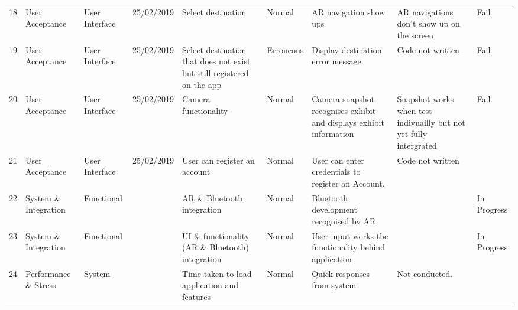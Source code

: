 \begin{adjustbox}{angle=90}
\begin{tabular}{l|l|l|l|p{3cm}|l|p{3cm}|p{3cm}|l}
18      & User Acceptance               & User Interface     & 25/02/2019     & Select destination                                                            & Normal    & AR navigation show ups                                                       & AR navigations don't show up on the screen                                  & Fail        \\
19      & User Acceptance               & User Interface     & 25/02/2019     & Select destination that does not exist but still registered on the app        & Erroneous & Display destination error message                                            & Code not written                                                            & Fail        \\
20      & User Acceptance               & User Interface     & 25/02/2019     & Camera functionality                                                          & Normal    & Camera snapshot recognises exhibit and displays exhibit information          & Snapshot works when test indivuailly but not yet fully intergrated          & Fail        \\
21      & User Acceptance               & User Interface     & 25/02/2019     & User can register an account                                                  & Normal    & User can enter credentials to register an Account.                           & Code not written                                                            &             \\
22      & System \& Integration         & Functional         &                & AR \& Bluetooth integration                                                   & Normal    & Bluetooth development recognised by AR                                       &                                                                             & In Progress \\
23      & System \& Integration         & Functional         &                & UI \& functionality (AR \& Bluetooth) integration                             & Normal    & User input works the functionality behind application                        &                                                                             & In Progress \\
24      & Performance \& Stress         & System             &                & Time taken to load application and features                                   & Normal    & Quick responses from system                                                  & Not conducted.                                                              &             \\

\end{tabular}
\end{adjustbox}
